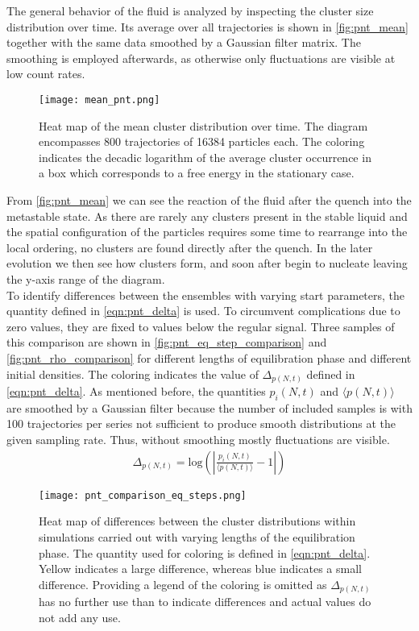 The general behavior of the fluid is analyzed by inspecting the cluster size distribution over time. Its average over all trajectories is shown in \autoref{fig:pnt_mean} together with the same data smoothed by a Gaussian filter matrix. The smoothing is employed afterwards, as otherwise only fluctuations are visible at low count rates.\\

\begin{figure}[h!]
\centering
\texttt{[image: mean\_pnt.png]}
\caption[Gaussian filter applied to cluster size distribution]{Heat map of the mean cluster distribution over time. The diagram encompasses 800 trajectories of 16384 particles each. The coloring indicates the decadic logarithm of the average cluster occurrence in a box which corresponds to a free energy in the stationary case.}
\label{fig:pnt_mean}
\end{figure}

From \autoref{fig:pnt_mean} we can see the reaction of the fluid after the quench into the metastable state. As there are rarely any clusters present in the stable liquid and the spatial configuration of the particles requires some time to rearrange into the local ordering, no clusters are found directly after the quench. In the later evolution we then see how clusters form, and soon after begin to nucleate leaving the y-axis range of the diagram.\\

To identify differences between the ensembles with varying start parameters, the quantity defined in \autoref{eqn:pnt_delta} is used. To circumvent complications due to zero values, they are fixed to values below the regular signal. Three samples of this comparison are shown in \autoref{fig:pnt_eq_step_comparison} and \autoref{fig:pnt_rho_comparison} for different lengths of equilibration phase and different initial densities. The coloring indicates the value of $\Delta_{p(N,t)}$ defined in \autoref{eqn:pnt_delta}. As mentioned before, the quantities $p_i(N,t)$ and $\langle p(N,t) \rangle$ are smoothed by a Gaussian filter because the number of included samples is with 100 trajectories per series not sufficient to produce smooth distributions at the given sampling rate. Thus, without smoothing mostly fluctuations are visible.
\begin{align}
\label{eqn:pnt_delta}
\Delta_{p(N,t)} = \text{log} \left( \left| \frac{p_i(N,t)}{\langle p(N,t) \rangle} -1 \right| \right)
\end{align}
\begin{figure}[h!]
\centering
\texttt{[image: pnt\_comparison\_eq\_steps.png]}
\caption[Heat maps of differences under variation of equilibration step number]{Heat map of differences between the cluster distributions within simulations carried out with varying lengths of the equilibration phase. The quantity used for coloring is defined in \autoref{eqn:pnt_delta}. Yellow indicates a large difference, whereas blue indicates a small difference. Providing a legend of the coloring is omitted as $\Delta_{p(N,t)}$ has no further use than to indicate differences and actual values do not add any use.}
\label{fig:pnt_eq_step_comparison}
\end{figure}

